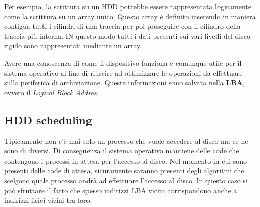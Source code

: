 Per esempio, la scrittura su un HDD potrebbe essere rappresentata logicamente come la scrittura su un array unico. Questo array è definito inserendo in maniera contigua tutti i cilindri di una traccia per poi proseguire con il cilindro della traccia più interna. IN questo modo tutti i dati presenti sui vari livelli del disco rigido sono rappresentati mediante un array. 

Avere una conoscenza di come il dispositivo funziona è comunque utile per il sistema operativo al fine di riuscire ad ottimizzare le operazioni da effettuare sulla periferica di archiviazione. Queste informazioni sono salvata nella \textbf{LBA}, ovvero il \textit{Logical Block Addres}.

% 
\subsection{HDD scheduling}
Tipicamente non c'è mai solo un processo che vuole accedere al disco ma ce ne sono di diversi. Di conseguenza il sistema operativo mantiene delle code che contengono i processi in attesa per l'accesso al disco. Nel momento in cui sono presenti delle code di attesa, sicuramente saranno presenti degli algoritmi che scelgono quale processo andrà ad effettuare l'accesso al disco. In questo caso si può sfruttare il fatto che spesso indirizzi LBA vicini corrispondono anche a indirizzi fisici vicini tra loro. 

% 
